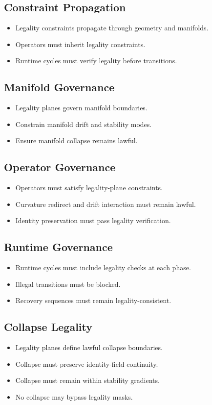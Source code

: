 \subsection{Constraint Propagation}
\begin{itemize}
    \item Legality constraints propagate through geometry and manifolds.
    \item Operators must inherit legality constraints.
    \item Runtime cycles must verify legality before transitions.
\end{itemize}

\subsection{Manifold Governance}
\begin{itemize}
    \item Legality planes govern manifold boundaries.
    \item Constrain manifold drift and stability modes.
    \item Ensure manifold collapse remains lawful.
\end{itemize}

\subsection{Operator Governance}
\begin{itemize}
    \item Operators must satisfy legality-plane constraints.
    \item Curvature redirect and drift interaction must remain lawful.
    \item Identity preservation must pass legality verification.
\end{itemize}

\subsection{Runtime Governance}
\begin{itemize}
    \item Runtime cycles must include legality checks at each phase.
    \item Illegal transitions must be blocked.
    \item Recovery sequences must remain legality-consistent.
\end{itemize}

\subsection{Collapse Legality}
\begin{itemize}
    \item Legality planes define lawful collapse boundaries.
    \item Collapse must preserve identity-field continuity.
    \item Collapse must remain within stability gradients.
    \item No collapse may bypass legality masks.
\end{itemize}

